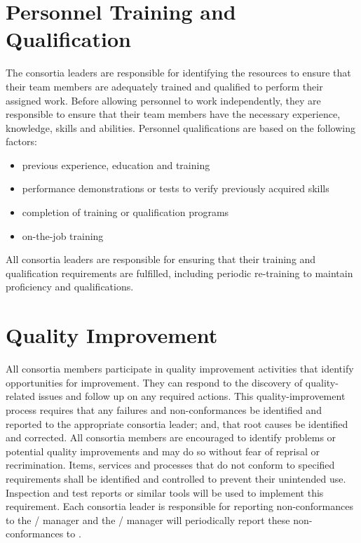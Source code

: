 \section{Personnel Training and Qualification}

The  consortia leaders are responsible for identifying the
resources to ensure that their team members are adequately trained and
qualified to perform their assigned work. Before allowing personnel to
work independently, they are responsible to ensure that their team
members have the necessary experience, knowledge, skills and
abilities. Personnel qualifications are based on the following
factors:
\begin{itemize}
 \item previous experience, education and training
 \item performance demonstrations or tests to verify previously
   acquired skills
 \item completion of training or qualification programs
 \item on-the-job training
\end{itemize}

All  consortia leaders are responsible for ensuring that
their training and qualification requirements are fulfilled, including
periodic re-training to maintain proficiency and qualifications.


\section{Quality Improvement}
\label{sec:quality_improvement}

All  consortia members participate in quality improvement
activities that identify opportunities for improvement. They can
respond to the discovery of quality-related issues and follow up on
any required actions. This quality-improvement process requires that
any failures and non-conformances be identified and reported to the
appropriate consortia leader; and, that root causes be identified and
corrected. All consortia members are encouraged to identify problems
or potential quality improvements and may do so without fear of
reprisal or recrimination. Items, services and processes that do not
conform to specified requirements shall be identified and controlled
to prevent their unintended use. Inspection and test reports or
similar tools will be used to implement this requirement. Each
consortia leader is responsible for reporting non-conformances to the
/  manager and the
/  manager will periodically report
these non-conformances to  .

